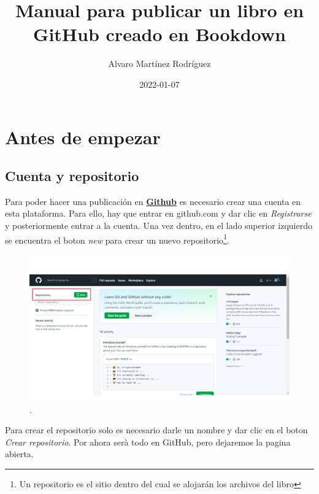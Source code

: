 \documentclass[
  11pt,
  spanish,
  oneside]{book}
\title{Manual para publicar un libro en GitHub creado en Bookdown}
\author{Alvaro Martínez Rodríguez}
\date{2022-01-07}
\begin{document}
\maketitle

{
\setcounter{tocdepth}{1}
\tableofcontents
}
\hypertarget{antes-de-empezar}{%
\chapter*{Antes de empezar}\label{antes-de-empezar}}

\hypertarget{cuenta-y-repositorio}{%
\section*{Cuenta y repositorio}\label{cuenta-y-repositorio}}

Para poder hacer una publicación en \href{https://github.com/}{\textbf{Github}} es necesario crear una cuenta en esta plataforma. Para ello, hay que entrar en github.com y dar clic en \emph{Registrarse} y posteriormente entrar a la cuenta. Una vez dentro, en el lado superior izquierdo se encuentra el boton \emph{new} para crear un nuevo repositorio\footnote{Un repositorio es el sitio dentro del cual se alojarán los archivos del libro}.

\begin{figure}

{\centering \includegraphics[width=1\linewidth]{imagenes/Imagen 1} 

}

\caption{.}\label{fig:unnamed-chunk-1}
\end{figure}

Para crear el repositorio solo es necesario darle un nombre y dar clic en el boton \emph{Crear repositorio}. Por ahora serà todo en GitHub, pero dejaremos la pagina abierta.
\end{document}

